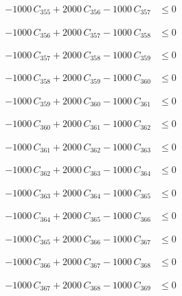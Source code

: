 \documentclass[a4paper,11pt]{article}
\begin{document}
\begin{align}
-1000\,C_{355} + 2000\,C_{356} - 1000\,C_{357} &\leq 0 \nonumber
\end{align}

\begin{align}
-1000\,C_{356} + 2000\,C_{357} - 1000\,C_{358} &\leq 0 \nonumber
\end{align}

\begin{align}
-1000\,C_{357} + 2000\,C_{358} - 1000\,C_{359} &\leq 0 \nonumber
\end{align}

\begin{align}
-1000\,C_{358} + 2000\,C_{359} - 1000\,C_{360} &\leq 0 \nonumber
\end{align}

\begin{align}
-1000\,C_{359} + 2000\,C_{360} - 1000\,C_{361} &\leq 0 \nonumber
\end{align}

\begin{align}
-1000\,C_{360} + 2000\,C_{361} - 1000\,C_{362} &\leq 0 \nonumber
\end{align}

\begin{align}
-1000\,C_{361} + 2000\,C_{362} - 1000\,C_{363} &\leq 0 \nonumber
\end{align}

\begin{align}
-1000\,C_{362} + 2000\,C_{363} - 1000\,C_{364} &\leq 0 \nonumber
\end{align}

\begin{align}
-1000\,C_{363} + 2000\,C_{364} - 1000\,C_{365} &\leq 0 \nonumber
\end{align}

\begin{align}
-1000\,C_{364} + 2000\,C_{365} - 1000\,C_{366} &\leq 0 \nonumber
\end{align}

\begin{align}
-1000\,C_{365} + 2000\,C_{366} - 1000\,C_{367} &\leq 0 \nonumber
\end{align}

\begin{align}
-1000\,C_{366} + 2000\,C_{367} - 1000\,C_{368} &\leq 0 \nonumber
\end{align}

\begin{align}
-1000\,C_{367} + 2000\,C_{368} - 1000\,C_{369} &\leq 0 \nonumber
\end{align}
\end{document}

